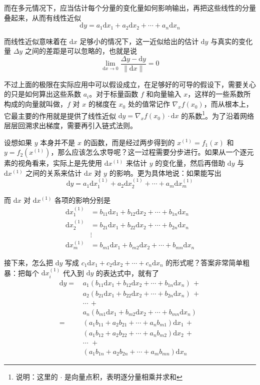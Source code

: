 而在多元情况下，应当估计每个分量的变化量如何影响输出，再把这些线性的分量叠起来，从而有线性近似
\[
    \mathrm{d}y = a_1 \mathrm{d}x_1 + a_2 \mathrm{d}x_2 + \cdots + a_n \mathrm{d}x_n
\]

而线性近似意味着在 $\mathrm{d}x$ 足够小的情况下，这一近似给出的估计 $\mathrm{d}y$ 与真实的变化量 $\Delta y$ 之间的差距是可以忽略的，也就是说
\[
    \lim_{\mathrm{d}x\to 0} \frac{\Delta y - \mathrm{d}y}{\|\mathrm{d}x\|} = 0
\]

不过上面的极限在实际应用中可以假设成立，在足够好的可导的假设下，需要关心的只是如何算出这些系数 $a_i$。对于标量函数 $f$ 和向量输入 $x$，这样的一些系数所构成的向量就叫做，$f$ 对 $x$ 的梯度在 $x_0$ 处的值常记作 $\nabla_x f(x_0)$，而从根本上，它最主要的作用就是提供了线性近似 $\mathrm{d}y = \nabla_x f(x_0) \cdot \mathrm{d}x$ 的系数\footnote{说明：这里的 $\cdot$ 是向量点积，表明逐分量相乘并求和}。为了沿着网络层层回溯求出梯度，需要再引入链式法则。

设想如果 $y$ 本身并不是 $x$ 的函数，而是经过两步得到的 $x^{(1)} = f_1(x)$ 和 $y = f_2(x^{(1)})$，那么应该怎么求导呢？这一过程需要分步进行。如果从一个逐元素的视角看来，实际上是先使用 $\mathrm{d}x^{(1)}$ 来估计 $y$ 的变化量，然后再借助 $\mathrm{d}y$ 与 $\mathrm{d}x^{(1)}$ 之间的关系来估计 $\mathrm{d}x$ 对 $y$ 的影响。更为具体地说：如果能写出
\[
    \mathrm{d}y = a_1 \mathrm{d}x^{(1)}_1 + a_2 \mathrm{d}x^{(1)}_2 + \cdots + a_m \mathrm{d}x^{(1)}_m
\]

而 $\mathrm{d}x$ 对 $\mathrm{d}x^{(1)}$ 各项的影响分别是
\[
\begin{aligned}
    \mathrm{d}x^{(1)}_1 &= b_{11} \mathrm{d}x_1 + b_{12} \mathrm{d}x_2 + \cdots + b_{1n} \mathrm{d}x_n \\
    \mathrm{d}x^{(1)}_2 &= b_{21} \mathrm{d}x_1 + b_{22} \mathrm{d}x_2 + \cdots + b_{2n} \mathrm{d}x_n \\
    &\vdots \\
    \mathrm{d}x^{(1)}_m &= b_{m1} \mathrm{d}x_1 + b_{m2} \mathrm{d}x_2 + \cdots + b_{mn} \mathrm{d}x_n
\end{aligned}
\]

接下来，怎么把 $\mathrm{d}y$ 写成 $c_1 \mathrm{d}x_1 + c_2 \mathrm{d}x_2 + \cdots + c_n \mathrm{d}x_n$ 的形式呢？答案非常简单粗暴：把每个 $\mathrm{d}x^{(1)}_i$ 代入到 $\mathrm{d}y$ 的表达式中，就有了
\[
\begin{aligned}
    \mathrm{d}y =\, & a_1 (b_{11} \mathrm{d}x_1 + b_{12} \mathrm{d}x_2 + \cdots + b_{1n} \mathrm{d}x_n) \, + \\
    & a_2 (b_{21} \mathrm{d}x_1 + b_{22} \mathrm{d}x_2 + \cdots + b_{2n} \mathrm{d}x_n) \, + \\
    & \cdots \, +\\
    & a_n (b_{m1} \mathrm{d}x_1 + b_{m2} \mathrm{d}x_2 + \cdots + b_{mn} \mathrm{d}x_n)\\
    =\, & (a_1 b_{11} + a_2 b_{21} + \cdots + a_n b_{m1}) \mathrm{d}x_1 \,+ \\
    & (a_1 b_{12} + a_2 b_{22} + \cdots + a_n b_{m2}) \mathrm{d}x_2 \,+ \\
    & \cdots \, \,+\\
    & (a_1 b_{1n} + a_2 b_{2n} + \cdots + a_m b_{mn}) \mathrm{d}x_n
\end{aligned}
\]

